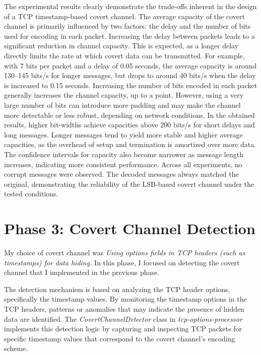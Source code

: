 \documentclass[10pt,a4paper]{article}
\begin{document}
The experimental results clearly demonstrate the trade-offs inherent in the design of a TCP timestamp-based covert channel. The average capacity of the covert channel is primarily influenced by two factors: the delay and the number of bits used for encoding in each packet.
Increasing the delay between packets leads to a significant reduction in channel capacity. This is expected, as a longer delay directly limits the rate at which covert data can be transmitted. For example, with 7 bits per packet and a delay of 0.05 seconds, the average capacity is around 130--145 bits/s for longer messages, but drops to around 40 bits/s when the delay is increased to 0.15 seconds.
Increasing the number of bits encoded in each packet generally increases the channel capacity, up to a point. However, using a very large number of bits can introduce more padding and may make the channel more detectable or less robust, depending on network conditions. In the obtained results, higher bit-widths achieve capacities above 200 bits/s for short delays and long messages.
Longer messages tend to yield more stable and higher average capacities, as the overhead of setup and termination is amortized over more data. The confidence intervals for capacity also become narrower as message length increases, indicating more consistent performance.
Across all experiments, no corrupt messages were observed. The decoded messages always matched the original, demonstrating the reliability of the LSB-based covert channel under the tested conditions.


\section*{Phase 3: Covert Channel Detection}
My choice of covert channel was \textit{Using options fields in TCP headers (such as timestamps) for data hiding.} 
In this phase, I focused on detecting the covert channel that I implemented in the previous phase.  

The detection mechanism is based on analyzing the TCP header options, specifically the timestamp values.
 By monitoring the timestamp options in the TCP headers, patterns or anomalies that may indicate the presence of hidden data are identified.
  The \textit{CovertChannelDetector} class in \textit{tcp-options-processor} implements this detection logic by capturing and inspecting TCP packets for specific timestamp values that correspond to the covert channel's encoding scheme.
\end{document}

